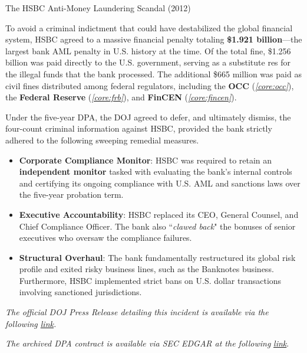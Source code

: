 \documentclass[10pt]{article}
\begin{document}
\begin{core}[label=core:hsbc_aml]{The HSBC Anti-Money Laundering Scandal (2012)}
\begin{itemize}
      \end{itemize}

      To avoid a criminal indictment that could have destabilized the global financial system, HSBC agreed to a massive financial penalty totaling \textbf{\$1.921 billion}---the largest bank AML penalty in U.S. history at the time. Of the total fine, \$1.256 billion was paid directly to the U.S. government, serving as a substitute res for the illegal funds that the bank processed. The additional \$665 million was paid as civil fines distributed among federal regulators, including the \textbf{OCC} (\textit{\autoref{core:occ}}), the \textbf{Federal Reserve} (\textit{\autoref{core:frb}}), and \textbf{FinCEN} (\textit{\autoref{core:fincen}}).

      Under the five-year DPA, the DOJ agreed to defer, and ultimately dismiss, the four-count criminal information against HSBC, provided the bank strictly adhered to the following sweeping remedial measures.

      \begin{itemize}

        \item \textbf{Corporate Compliance Monitor}: HSBC was required to retain an \textbf{independent monitor} tasked with evaluating the bank's internal controls and certifying its ongoing compliance with U.S. AML and sanctions laws over the five-year probation term.

        \item \textbf{Executive Accountability}: HSBC replaced its CEO, General Counsel, and Chief Compliance Officer. The bank also ``\textit{clawed back}" the bonuses of senior executives who oversaw the compliance failures.

        \item \textbf{Structural Overhaul}: The bank fundamentally restructured its global risk profile and exited risky business lines, such as the Banknotes business. Furthermore, HSBC implemented strict bans on U.S. dollar transactions involving sanctioned jurisdictions.

      \end{itemize}

      \textit{The official DOJ Press Release detailing this incident is available via the following \href{https://www.justice.gov/archives/opa/pr/hsbc-holdings-plc-and-hsbc-bank-usa-na-admit-anti-money-laundering-and-sanctions-violations}{link}.}

      \textit{The archived DPA contract is available via SEC EDGAR at the following} \href{https://www.sec.gov/Archives/edgar/data/83246/000119312512499980/d453978dex101.htm#:~:text=DEFERRED%20PROSECUTION%20AGREEMENT.%20Defendant%20HSBC%20Bank%20USA%2C,*%20Criminal%20Information%20and%20Acceptance%20of%20Responsibility.}{\textit{link}}.

    \end{core}
\end{document}
